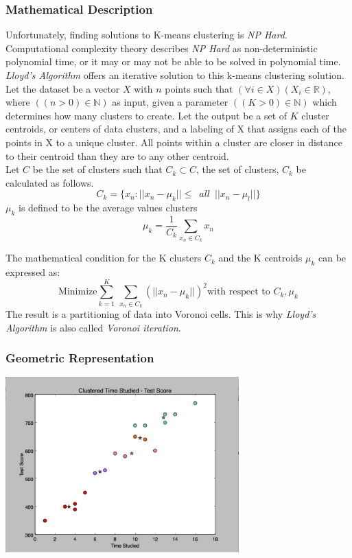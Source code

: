 \documentclass[12pt]{article}
\begin{document}
\subsubsection{Mathematical Description}
Unfortunately, finding solutions to K-means clustering is \textit{NP Hard}. Computational complexity theory describes \textit{NP Hard}  as non-deterministic polynomial time, or it may or may not be able to be solved in polynomial time. \textit{Lloyd's Algorithm} offers an iterative solution to this k-means clustering solution. Let the dataset be a vector $X$ with $n$ points such that $(\forall i \in X)(X_i \in \mathbb{R})$, where $((n>0) \in \mathbb{N})$ as input, given a parameter $((K >0) \in \mathbb{N})$ which determines how many clusters to create. Let the output be a set of $K$ cluster centroids, or centers of data clusters, and a labeling of X that assigns each of the points in X to a unique cluster. All points within a cluster are closer in distance to their centroid than they are to any other centroid. \\
Let $C$ be the set of clusters such that $C_k \subset C$, the set of clusters, $C_k$ be calculated as follows. \\
\begin{equation}
	C_k = \{ x_n : \vert \vert x_n - \mu_k \vert \vert \leq \,\,\, all \,\,\, \vert \vert x_n - \mu_l \vert \vert \}
\end{equation}
$\mu_k$ is defined to be the average values clusters 
\begin{equation}
\mu_k = \frac{1}{C_k} \sum_{x_n \in C_k} x_n	
\end{equation}

The mathematical condition for the K clusters $C_k$ and the K centroids $\mu_k$ can be expressed as:\\
\begin{equation}
	\text{Minimize} \sum_{k=1}^{K}\,\sum_{x_n \in C_k} (\vert \vert x_n - \mu_k \vert \vert )^2 \text{with respect to}\,\, C_k, \mu_k
\end{equation} \cite{dsl}
The result is a partitioning of data into Voronoi cells. This is why \textit{Lloyd's Algorithm} is also called \textit{Voronoi iteration}.
\subsubsection{Geometric Representation}
\includegraphics[width=90mm]{img/clustered}\\
\end{document}
